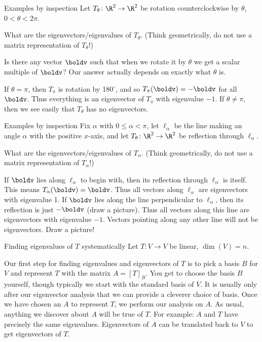 \begin{frame}{Examples by inspection}
Let $T_\theta\colon\R^2\rightarrow\R^2$ be rotation counterclockwise by $\theta$, $0<\theta<2\pi$.  

What are the eigenvectors/eigenvalues of $T_\theta$. (Think geometrically, do not use a matrix representation of $T_\theta$!)
\begin{bsolution}
Is there any vector $\boldv$ such that when we rotate it by $\theta$ we get a scalar multiple of $\boldv$?
\bspace
Our answer actually depends on exactly what $\theta$ is. 

If $\theta=\pi$, then $T_\pi$ is rotation by 180$^\circ$, and so $T_\pi(\boldv)=-\boldv$ for all $\boldv$. Thus everything is an eigenvector of $T_\pi$ with eigenvalue $-1$. 
\bspace
If $\theta\ne\pi$, then we see easily that $T_\theta$ has no eigenvectors. 
\end{bsolution}
\end{frame}
\begin{frame}{Examples by inspection}
Fix $\alpha$ with $0\leq \alpha<\pi$, let $\ell_\alpha$ be the line making an angle $\alpha$ with the positive $x$-axis, and let $T_\theta\colon\R^2\rightarrow\R^2$ be reflection through $\ell_\alpha$.

What are the eigenvectors/eigenvalues of $T_\alpha$. (Think geometrically, do not use a matrix representation of $T_\alpha$!)
\begin{bsolution}
If $\boldv$ lies along $\ell_\alpha$ to begin with, then its reflection through $\ell_\alpha$ is itself. This means $T_\alpha(\boldv)=\boldv$. Thus all vectors along $\ell_\alpha$ are eigenvectors with eigenvalue 1. 
\bspace
If $\boldv$ lies along the line perpendicular to $\ell_\alpha$, then its reflection is just $-\boldv$ (draw a picture). Thus all vectors along this line are eigenvectors with eigenvalue $-1$. 
\bspace 
Vectors pointing along any other line will not be eigenvectors. Draw a picture!

\end{bsolution}
\end{frame}
\begin{frame}{Finding eigenvalues of $T$ systematically}
Let $T\colon V\rightarrow V$ be linear, $\dim(V)=n$. 

Our first step for finding eigenvalues and eigenvectors of $T$ is to 
pick a basis $B$ for $V$ and represent $T$ with the matrix $A=[T]_B$.  
\bpause You get to choose the basis $B$ yourself, though typically we start with the standard basis of $V$. It is usually only after our eigenvector analysis that we can provide a cleverer choice of basis. 
\bpause
Once we have chosen an $A$ to represent $T$, we perform our analysis on $A$. As usual, anything we discover about $A$ will be true of $T$. For example:
\bb
\ii $A$ and $T$ have precisely the same eigenvalues.
\ii Eigenvectors of $A$ can be translated back to $V$ to get eigenvectors of $T$. 
\ee
\end{frame}
